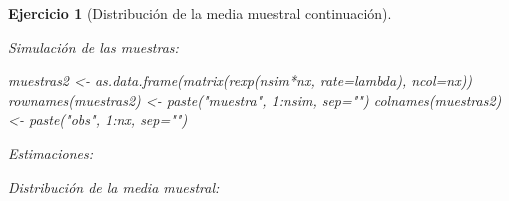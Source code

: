 \documentclass[
]{book}
\newenvironment{Shaded}{\begin{snugshade}}{\end{snugshade}}
\newcommand{\AttributeTok}[1]{\textcolor[rgb]{0.77,0.63,0.00}{#1}}
\newcommand{\DecValTok}[1]{\textcolor[rgb]{0.00,0.00,0.81}{#1}}
\newcommand{\FunctionTok}[1]{\textcolor[rgb]{0.00,0.00,0.00}{#1}}
\newcommand{\NormalTok}[1]{#1}
\newcommand{\OtherTok}[1]{\textcolor[rgb]{0.56,0.35,0.01}{#1}}
\newcommand{\SpecialCharTok}[1]{\textcolor[rgb]{0.00,0.00,0.00}{#1}}
\newcommand{\StringTok}[1]{\textcolor[rgb]{0.31,0.60,0.02}{#1}}
\theoremstyle{break}
\newtheorem{exercise}{Ejercicio}[chapter]
\theoremstyle{nonumberplain}
\begin{document}
\begin{exercise}[Distribución de la media muestral continuación]
\begin{enumerate}
  Simulación de las muestras:

\begin{Shaded}
\begin{Highlighting}[]
\NormalTok{muestras2 }\OtherTok{\textless{}{-}} \FunctionTok{as.data.frame}\NormalTok{(}\FunctionTok{matrix}\NormalTok{(}\FunctionTok{rexp}\NormalTok{(nsim}\SpecialCharTok{*}\NormalTok{nx, }\AttributeTok{rate=}\NormalTok{lambda), }\AttributeTok{ncol=}\NormalTok{nx))}
\FunctionTok{rownames}\NormalTok{(muestras2) }\OtherTok{\textless{}{-}} \FunctionTok{paste}\NormalTok{(}\StringTok{"muestra"}\NormalTok{, }\DecValTok{1}\SpecialCharTok{:}\NormalTok{nsim, }\AttributeTok{sep=}\StringTok{""}\NormalTok{)}
\FunctionTok{colnames}\NormalTok{(muestras2) }\OtherTok{\textless{}{-}} \FunctionTok{paste}\NormalTok{(}\StringTok{"obs"}\NormalTok{, }\DecValTok{1}\SpecialCharTok{:}\NormalTok{nx, }\AttributeTok{sep=}\StringTok{""}\NormalTok{)}
\end{Highlighting}
\end{Shaded}

  Estimaciones:

\begin{Shaded}
\end{Shaded}

  Distribución de la media muestral:


\end{enumerate}
\end{exercise}
\end{document}
